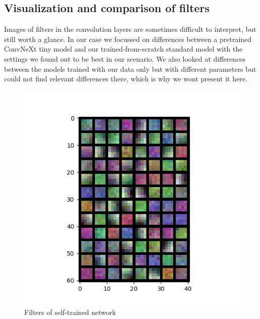 \documentclass{article}
\begin{document}
\subsection{Visualization and comparison of filters}\label{subsec:filter-images}
Images of filters in the convolution layers are sometimes difficult to interpret, but still worth a glance.
In our case we focussed on differences between a pretrained ConvNeXt tiny model and our trained-from-scratch standard model with the settings we found out to be best in our scenario.
We also looked at differences between the models trained with our data only but with different parameters but could not find relevant differences there, which is why we wont present it here.
\begin{figure}[h]
    \centering
    \begin{minipage}[b]{0.49\textwidth}
        \includegraphics[width=\textwidth]{images/filters_layer0_from_scratch}
        \caption{Filters of self-trained network}
    \end{minipage}
    \hfill
    \begin{minipage}[b]{0.49\textwidth}

\end{minipage}
\end{figure}
\end{document}
